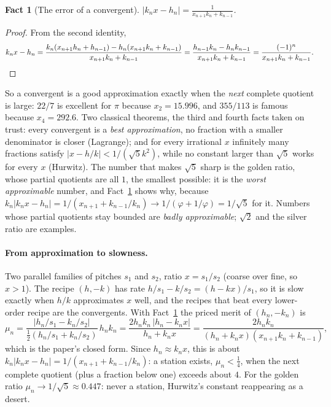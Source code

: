 \documentclass[10pt]{article}
\theoremstyle{plain}
\newtheorem{fact}{Fact}[section]
\theoremstyle{definition}
\begin{document}
\begin{fact}[The error of a convergent]
\label{f:cferror}
$\displaystyle |k_nx-h_n|=\frac{1}{x_{n+1}k_n+k_{n-1}}$.
\end{fact}

\begin{proof}
From the second identity,
\[
  k_nx-h_n=\frac{k_n(x_{n+1}h_n+h_{n-1})-h_n(x_{n+1}k_n+k_{n-1})}{x_{n+1}k_n+k_{n-1}}
  =\frac{h_{n-1}k_n-h_nk_{n-1}}{x_{n+1}k_n+k_{n-1}}=\frac{(-1)^n}{x_{n+1}k_n+k_{n-1}}.\qedhere
\]
\end{proof}

So a convergent is a good approximation exactly when the \emph{next}
complete quotient is large: $22/7$ is excellent for $\pi$ because
$x_2=15.996$, and $355/113$ is famous because $x_4=292.6$. Two classical
theorems, the third and fourth facts taken on trust: every convergent is a
\emph{best approximation}, no fraction with a smaller denominator is closer
(Lagrange); and for every irrational $x$ infinitely many fractions satisfy
$|x-h/k|<1/(\sqrt5k^2)$, while no constant larger than $\sqrt5$ works for
every $x$ (Hurwitz). The number that makes $\sqrt5$ sharp is the golden
ratio, whose partial quotients are all $1$, the smallest possible: it is
the \emph{worst approximable} number, and Fact~\ref{f:cferror} shows why,
because $k_n|k_nx-h_n|=1/(x_{n+1}+k_{n-1}/k_n)\to1/(\varphi+1/\varphi)=1/\sqrt5$
for it. Numbers whose partial quotients stay bounded are \emph{badly
approximable}; $\sqrt2$ and the silver ratio are examples.

\paragraph{From approximation to slowness.}
Two parallel families of pitches $s_1$ and $s_2$, ratio $x=s_1/s_2$ (coarse
over fine, so $x>1$). The recipe $(h,-k)$ has rate $h/s_1-k/s_2=(h-kx)/s_1$,
so it is slow exactly when $h/k$ approximates $x$ well, and the recipes that
beat every lower-order recipe are the convergents. With
Fact~\ref{f:cferror} the priced merit of $(h_n,-k_n)$ is
\[
  \mu_n=\frac{|h_n/s_1-k_n/s_2|}{\tfrac12(h_n/s_1+k_n/s_2)}\,h_nk_n
  =\frac{2h_nk_n\,|h_n-k_nx|}{h_n+k_nx}
  =\frac{2h_nk_n}{(h_n+k_nx)(x_{n+1}k_n+k_{n-1})},
\]
which is the paper's closed form. Since $h_n\approx k_nx$, this is about
$k_n|k_nx-h_n|=1/(x_{n+1}+k_{n-1}/k_n)$: a station exists, $\mu_n<\tfrac14$,
when the next complete quotient (plus a fraction below one) exceeds about
$4$. For the golden ratio $\mu_n\to1/\sqrt5\approx0.447$: never a station,
Hurwitz's constant reappearing as a desert.
\end{document}
